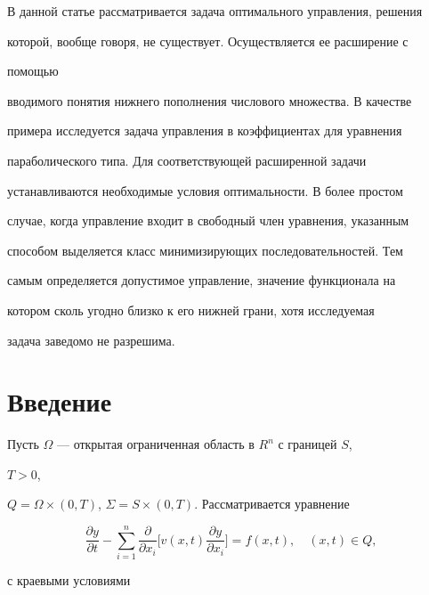 \label{begin} 


 


 


В данной статье рассматривается задача оптимального управления, решения 


которой, вообще говоря, не существует. Осуществляется ее расширение с 


помощью 


вводимого понятия нижнего пополнения числового множества. В качестве 


примера исследуется задача управления в коэффициентах для уравнения 


параболического типа. Для соответствующей расширенной задачи 


устанавливаются необходимые условия оптимальности. В более простом 


случае, когда управление входит в свободный член уравнения, указанным 


способом выделяется класс минимизирующих последовательностей. Тем 


самым определяется допустимое управление, значение функционала на 


котором сколь угодно близко к его нижней грани, хотя исследуемая 


задача заведомо не разрешима. 


 


\section{Введение} 


 


Пусть $\Omega$ --- открытая ограниченная область в $R^n$ с границей $S$, 


$T>0$, 


$Q=\Omega\times(0,T)$, $\Sigma=S\times(0,T)$. Рассматривается уравнение 


\begin{equation} 


\frac{\partial y}{\partial t}-\sum^n_{i=1} 


\frac{\partial }{\partial x_i}\bigg[v(x,t) 


\frac{\partial y}{\partial x_i}\bigg]=f(x,t),\quad (x,t)\in Q, 


\end{equation} 


с краевыми условиями 


